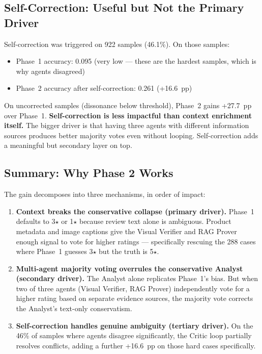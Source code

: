 \documentclass[12pt,a4paper]{article}
\begin{document}
\subsection{Self-Correction: Useful but Not the Primary Driver}

Self-correction was triggered on 922 samples (46.1\%). On those samples:

\begin{itemize}[leftmargin=*]
  \item Phase~1 accuracy: 0.095 (very low --- these are the hardest samples, which is why
    agents disagreed)
  \item Phase~2 accuracy after self-correction: 0.261 (+16.6~pp)
\end{itemize}

On uncorrected samples (dissonance below threshold), Phase~2 gains +27.7~pp over Phase~1.
\textbf{Self-correction is less impactful than context enrichment itself.} The bigger driver
is that having three agents with different information sources produces better majority votes
even without looping. Self-correction adds a meaningful but secondary layer on top.

\subsection{Summary: Why Phase 2 Works}

The gain decomposes into three mechanisms, in order of impact:

\begin{enumerate}[leftmargin=*]
  \item \textbf{Context breaks the conservative collapse (primary driver).}
    Phase~1 defaults to 3$\star$ or 1$\star$ because review text alone is ambiguous.
    Product metadata and image captions give the Visual Verifier and RAG Prover enough
    signal to vote for higher ratings --- specifically rescuing the 288 cases where Phase~1
    guesses 3$\star$ but the truth is 5$\star$.

  \item \textbf{Multi-agent majority voting overrules the conservative Analyst (secondary
    driver).} The Analyst alone replicates Phase~1's bias. But when two of three agents
    (Visual Verifier, RAG Prover) independently vote for a higher rating based on separate
    evidence sources, the majority vote corrects the Analyst's text-only conservatism.

  \item \textbf{Self-correction handles genuine ambiguity (tertiary driver).}
    On the 46\% of samples where agents disagree significantly, the Critic loop partially
    resolves conflicts, adding a further +16.6~pp on those hard cases specifically.
\end{enumerate}
\end{document}
